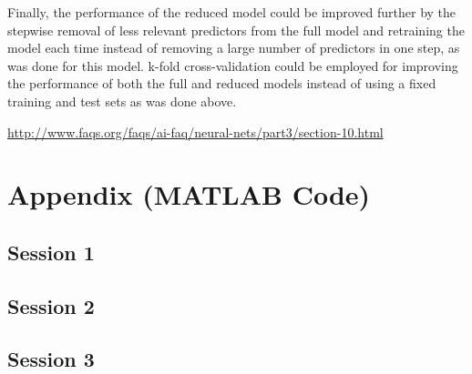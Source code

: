 \documentclass[paper=a4, fontsize=11pt]{scrartcl} %
\numberwithin{equation}{section} %
\begin{document}
Finally, the performance of the reduced model could be improved further by the stepwise removal of less relevant predictors from the full model and retraining the model each time instead of removing a large number of predictors in one step, as was done for this model. k-fold cross-validation could be employed for improving the performance of both the full and reduced models instead of using a fixed training and test sets as was done above.

\begin{thebibliography}{1}
 \url{http://www.faqs.org/faqs/ai-faq/neural-nets/part3/section-10.html}
\end{thebibliography}

\section{Appendix (MATLAB Code)}
\subsection*{Session 1}


\subsection*{Session 2}


\subsection*{Session 3}


\end{document}

